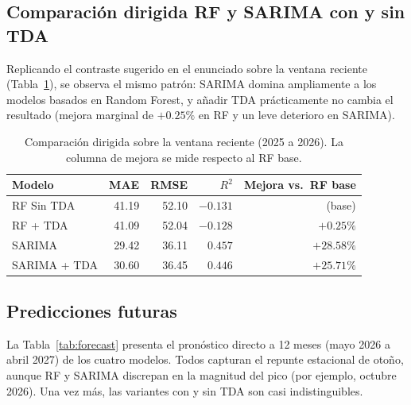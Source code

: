 \documentclass[11pt,a4paper]{article}
\begin{document}
\subsection{Comparación dirigida RF y SARIMA con y sin TDA}
\label{sec:rfsarima}
Replicando el contraste sugerido en el enunciado sobre la ventana reciente
(Tabla~\ref{tab:rfsarima}), se observa el mismo patrón: SARIMA domina ampliamente
a los modelos basados en Random Forest, y añadir TDA prácticamente no cambia el
resultado (mejora marginal de $+0.25\%$ en RF y un leve deterioro en SARIMA).

\begin{table}[H]
  \centering
  \caption{Comparación dirigida sobre la ventana reciente (2025 a 2026). La
  columna de mejora se mide respecto al RF base.}
  \label{tab:rfsarima}
  \small
  \begin{tabular}{lrrrr}
    \toprule
    Modelo & MAE & RMSE & $R^2$ & Mejora vs.\ RF base \\
    \midrule
    RF Sin TDA   & 41.19 & 52.10 & $-0.131$ & (base) \\
    RF + TDA     & 41.09 & 52.04 & $-0.128$ & $+0.25\%$ \\
    SARIMA       & 29.42 & 36.11 & $0.457$ & $+28.58\%$ \\
    SARIMA + TDA & 30.60 & 36.45 & $0.446$ & $+25.71\%$ \\
    \bottomrule
  \end{tabular}
\end{table}

\subsection{Predicciones futuras}
La Tabla~\ref{tab:forecast} presenta el pronóstico directo a 12 meses
(mayo 2026 a abril 2027) de los cuatro modelos. Todos capturan el repunte
estacional de otoño, aunque RF y SARIMA discrepan en la magnitud del pico
(por ejemplo, octubre 2026). Una vez más, las variantes con y sin TDA son casi
indistinguibles.
\end{document}
